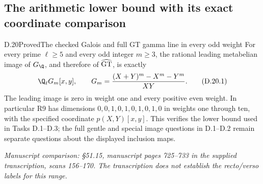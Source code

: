 \subsection{The arithmetic lower bound with its exact coordinate comparison}

\begin{statement}{D.20}{Proved}{The checked Galois and full GT gamma line in every odd weight}
For every prime $\ell\ge5$ and every odd integer $m\ge3$, the
rational leading metabelian image of $G_\Q$, and therefore of
$\widehat{\rm GT}$, is exactly
\[
 \Q_\ell G_m[x,y],\qquad
 G_m=\frac{(X+Y)^m-X^m-Y^m}{XY}.
 \tag{D.20.1}
\]
The leading image is zero in weight one and every positive even
weight. In particular R9 has dimensions
$0,0,1,0,1,0,1,0,1,0$ in weights one through ten, with the
specified coordinate $p(X,Y)[x,y]$.
This verifies the lower bound used in Tasks D.1--D.3; the full
gentle and special image questions in D.1--D.2 remain separate
questions about the displayed inclusion maps.
\par\smallskip\noindent\emph{Manuscript comparison: \S51.15,
manuscript pages 725--733 in the supplied transcription,
scans 156--170. The transcription does not establish the
recto/verso labels for this range.}
\end{statement}
